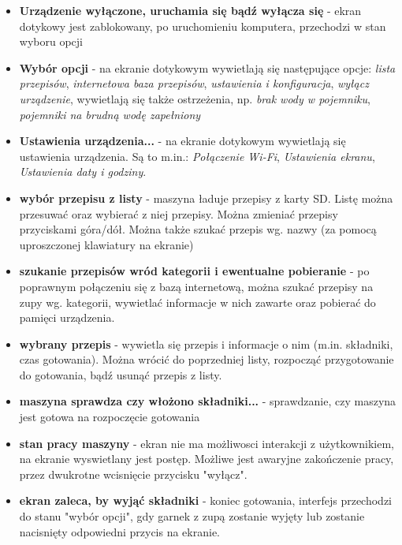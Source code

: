 \documentclass[12pt,a4paper,notitlepage]{article}
\begin{document}
\begin{itemize}

\item \textbf{Urządzenie wyłączone, uruchamia się bądź wyłącza się} - ekran dotykowy jest zablokowany, po uruchomieniu komputera, przechodzi w stan wyboru opcji
\item \textbf{Wybór opcji} - na ekranie dotykowym wywietlają się następujące opcje: \emph{lista przepisów}, \emph{internetowa baza przepisów}, \emph{ustawienia i konfiguracja}, \emph{wyłącz urządzenie}, wywietlają się także ostrzeżenia, np. \emph{brak wody w pojemniku}, \emph{pojemniki na brudną wodę zapełniony} 
\item \textbf{Ustawienia urządzenia...} - na ekranie dotykowym wywietlają się ustawienia urządzenia. Są to m.in.: \emph{Połączenie Wi-Fi}, \emph{Ustawienia ekranu}, \emph{Ustawienia daty i godziny}.
\item \textbf{wybór przepisu z listy} - maszyna ładuje przepisy z karty SD. Listę można przesuwać oraz wybierać z niej przepisy. Można zmieniać przepisy przyciskami góra/dół. Można także szukać przepis wg. nazwy (za pomocą uproszczonej klawiatury na ekranie)
\item \textbf{szukanie przepisów wród kategorii i ewentualne pobieranie} - po poprawnym połączeniu się z bazą internetową, można szukać przepisy na zupy wg. kategorii, wywietlać informacje w nich zawarte oraz pobierać do pamięci urządzenia. 
\item \textbf{wybrany przepis} - wywietla się przepis i informacje o nim (m.in. składniki, czas gotowania). Można wrócić do poprzedniej listy, rozpocząć przygotowanie do gotowania, bądź usunąć przepis z listy.
\item \textbf{maszyna sprawdza czy włożono składniki...} - sprawdzanie, czy maszyna jest gotowa na rozpoczęcie gotowania
\item \textbf{stan pracy maszyny} - ekran nie ma możliwosci interakcji z użytkownikiem, na ekranie wyswietlany jest postęp. Możliwe jest awaryjne zakończenie pracy, przez dwukrotne wcisnięcie przycisku "wyłącz".
\item \textbf{ekran zaleca, by wyjąć składniki} - koniec gotowania, interfejs przechodzi do stanu "wybór opcji", gdy garnek z zupą zostanie wyjęty lub zostanie nacisnięty odpowiedni przycis na ekranie.

\end{itemize}
\end{document}
